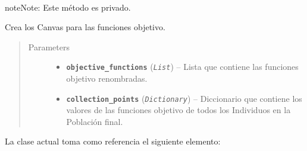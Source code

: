 \documentclass[class=report, crop=false]{standalone}
\begin{document}
\begin{fulllineitems}
\begin{fulllineitems}
\end{fulllineitems}

\begin{fulllineitems}

~

\begin{notice}{note}{Note:}
Este método es privado.
\end{notice}

Crea los Canvas para las funciones objetivo.

\begin{quote}\begin{description}
\item[{Parameters}] \leavevmode\begin{itemize}
\item \textbf{\texttt{objective\_functions}} (\emph{\texttt{List}}) -- Lista que contiene las funciones objetivo renombradas.
\item \textbf{\texttt{collection\_points}} (\emph{\texttt{Dictionary}}) -- Diccionario que contiene los valores de las funciones objetivo de todos los Individuos en la Población final.
\end{itemize}
\end{description}\end{quote}

\end{fulllineitems}

\end{fulllineitems}

La clase actual toma como referencia el siguiente elemento:
\end{document}
